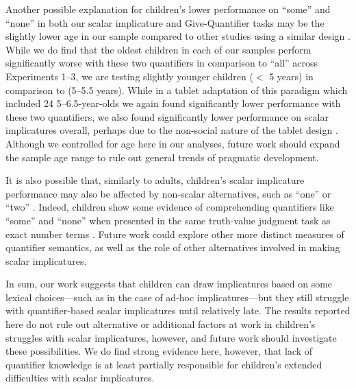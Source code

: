 \documentclass[man]{apa2}
\begin{document}
{Another possible explanation for children's lower performance on ``some'' and ``none'' in both our scalar implicature and Give-Quantifier tasks may be the slightly lower age in our sample compared to other studies using a similar design \cite{skordos2014,skordos2016}. While we do find that the oldest children in each of our samples perform significantly worse with these two quantifiers in comparison to ``all'' across Experiments 1--3, we are testing slightly younger children ($<$ 5 years) in comparison to \cite{-skordos2016} (5--5.5 years). While in a tablet adaptation of this paradigm which included 24 5--6.5-year-olds we again found significantly lower performance with these two quantifiers, we also found significantly lower performance on scalar implicatures overall, perhaps due to the non-social nature of the tablet design \cite{schneider2016}. Although we controlled for age here in our analyses, future work should expand the sample age range to rule out general trends of pragmatic development.

It is also possible that, similarly to adults, children's scalar implicature performance may also be affected by non-scalar alternatives, such as ``one'' or ``two'' . Indeed, children show some evidence of comprehending quantifiers like ``some'' and ``none'' when presented in the same truth-value judgment task as exact number terms . Future work could explore other more distinct measures of quantifier semantics, as well as the role of other alternatives involved in making scalar implicatures.


In sum, our work suggests that children can draw implicatures based on some lexical choices---such as in the case of ad-hoc implicatures---but they still struggle with quantifier-based scalar implicatures until relatively late. The results reported here do not rule out alternative or additional factors at work in children's struggles with scalar implicatures, however, and future work should investigate these possibilities. We do find strong evidence here, however, that lack of quantifier knowledge is at least partially responsible for children's extended difficulties with scalar implicatures.

}
\end{document}

